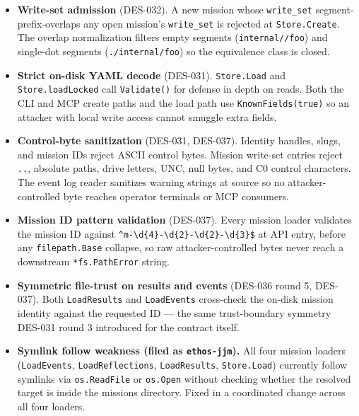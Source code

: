 \documentclass[a4paper,10pt]{article}
\newcommand{\field}[1]{\texttt{#1}}
\begin{document}
\begin{itemize}
  \item \textbf{Write-set admission} (DES-032).  A new mission whose
    \field{write\_set} segment-prefix-overlaps any open mission's
    \field{write\_set} is rejected at \texttt{Store.Create}.  The
    overlap normalization filters empty segments
    (\texttt{internal//foo}) and single-dot segments
    (\texttt{./internal/foo}) so the equivalence class is closed.
  \item \textbf{Strict on-disk YAML decode} (DES-031).
    \texttt{Store.Load} and \texttt{Store.loadLocked} call
    \texttt{Validate()} for defense in depth on reads.  Both the
    CLI and MCP create paths and the load path use
    \texttt{KnownFields(true)} so an attacker with local write
    access cannot smuggle extra fields.
  \item \textbf{Control-byte sanitization} (DES-031, DES-037).
    Identity handles, slugs, and mission IDs reject ASCII control
    bytes.  Mission write-set entries reject \texttt{..}, absolute
    paths, drive letters, UNC, null bytes, and C0 control
    characters.  The event log reader sanitizes warning strings at
    source so no attacker-controlled byte reaches operator
    terminals or MCP consumers.
  \item \textbf{Mission ID pattern validation} (DES-037).  Every
    mission loader validates the mission ID against
    \verb|^m-\d{4}-\d{2}-\d{2}-\d{3}$| at API entry, before any
    \texttt{filepath.Base} collapse, so raw attacker-controlled
    bytes never reach a downstream \texttt{*fs.PathError} string.
  \item \textbf{Symmetric file-trust on results and events} (DES-036
    round 5, DES-037).  Both \texttt{LoadResults} and
    \texttt{LoadEvents} cross-check the on-disk mission identity
    against the requested ID --- the same trust-boundary symmetry
    DES-031 round 3 introduced for the contract itself.
  \item \textbf{Symlink follow weakness (filed as
    \texttt{ethos-jjm}).}  All four mission loaders
    (\texttt{LoadEvents}, \texttt{LoadReflections},
    \texttt{LoadResults}, \texttt{Store.Load}) currently follow
    symlinks via \texttt{os.ReadFile} or \texttt{os.Open} without
    checking whether the resolved target is inside the missions
    directory.  Fixed in a coordinated change across all four
    loaders.
\end{itemize}

\end{document}
